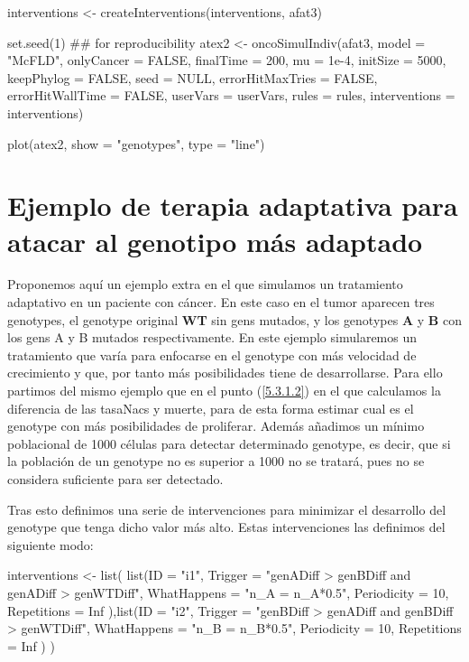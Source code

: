 \begin{R}
interventions <- createInterventions(interventions, afat3)

set.seed(1) ## for reproducibility
atex2 <- oncoSimulIndiv(afat3,
                       model = "McFLD", 
                       onlyCancer = FALSE, 
                       finalTime = 200,
                       mu = 1e-4,
                       initSize = 5000, 
                       keepPhylog = FALSE,
                       seed = NULL, 
                       errorHitMaxTries = FALSE, 
                       errorHitWallTime = FALSE,
                       userVars = userVars,
                       rules = rules,
                       interventions = interventions)

plot(atex2, show = "genotypes", type = "line")
\end{R}

\section{Ejemplo de terapia adaptativa para atacar al genotipo más adaptado}\label{A.5}

Proponemos aquí un ejemplo extra en el que simulamos un tratamiento adaptativo en un paciente con cáncer. En este caso en el tumor aparecen tres \glspl{genotype}, el \gls{genotype} original \textbf{WT} sin \glspl{gen} mutados, y los \glspl{genotype} \textbf{A} y \textbf{B} con los \glspl{gen} A y B mutados respectivamente. En este ejemplo simularemos un tratamiento que varía para enfocarse en el \gls{genotype} con más velocidad de crecimiento y que, por tanto más posibilidades tiene de desarrollarse. Para ello partimos del mismo ejemplo que en el punto (\ref{5.3.1.2}) en el que calculamos la diferencia de las \glspl{tasaNac} y muerte, para de esta forma estimar cual es el \gls{genotype} con más posibilidades de proliferar. Además añadimos un mínimo poblacional de 1000 células para detectar determinado \gls{genotype}, es decir, que si la población de un \gls{genotype} no es superior a 1000 no se tratará, pues no se considera suficiente para ser detectado.

Tras esto definimos una serie de intervenciones para minimizar el desarrollo del \gls{genotype} que tenga dicho valor más alto. Estas intervenciones las definimos del siguiente modo:

\begin{R}
	interventions <- list(
	list(ID           = "i1",
	Trigger       = "genADiff > genBDiff and genADiff > genWTDiff",
	WhatHappens   = "n_A = n_A*0.5",
	Periodicity   = 10,
	Repetitions   = Inf
	),list(ID           = "i2",
	Trigger       = "genBDiff > genADiff and genBDiff > genWTDiff",
	WhatHappens   = "n_B = n_B*0.5",
	Periodicity   = 10,
	Repetitions   = Inf
	)
	)
\end{R}

